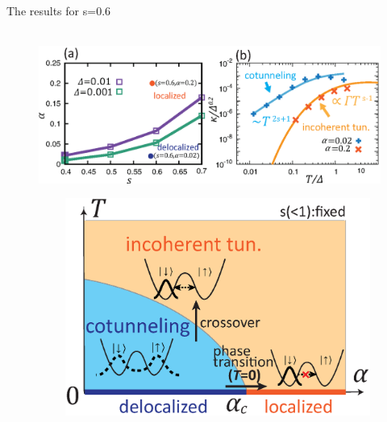 The results for s=0.6
\begin{figure}[tb]
　\centering
　\includegraphics[width=165mm]{localization_phasediagram.eps}
　\caption{}
\end{figure}


\begin{figure}[tb]
　\centering
　\includegraphics[width=100mm]{sub_ohmic_phasediagram.eps}
　\caption{}
\end{figure}
